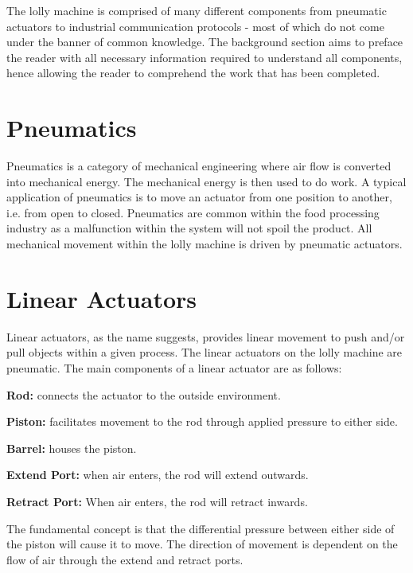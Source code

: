 

The lolly machine is comprised of many different components from pneumatic actuators to industrial communication protocols - most of which do not come under the banner of common knowledge. The background section aims to preface the reader with all necessary information required to understand all components, hence allowing the reader to comprehend the work that has been completed. 

\section{Pneumatics}
    Pneumatics is a category of mechanical engineering  where air flow is converted into mechanical energy\cite{parr2011hydraulics}. The mechanical energy is then used to do work. A typical application of pneumatics is to move an actuator from one position to another, i.e. from open to closed. Pneumatics are common within the food processing industry as a malfunction within the system will not spoil the product.
    All mechanical movement within the lolly machine is driven by pneumatic actuators.
    
\section{Linear Actuators}
    Linear actuators, as the name suggests, provides linear movement to push and/or pull objects within a given process. The linear actuators on the lolly machine are pneumatic. The main components of a linear actuator are as follows:
    
    \begin{description} 
        \item\textbf{Rod:} connects the actuator to the outside environment.
        \item\textbf{Piston:} facilitates movement to the rod through applied pressure to either side.
        \item\textbf{Barrel:} houses the piston.
        \item\textbf{Extend Port:} when air enters, the rod will extend outwards.
        \item\textbf{Retract Port:} When air enters, the rod will retract inwards.
    \end{description}
    
    The fundamental concept is that the differential pressure between either side of the piston will cause it to move\cite{parr2011hydraulics}. The direction of movement is dependent on the flow of air through the extend and retract ports.
    

